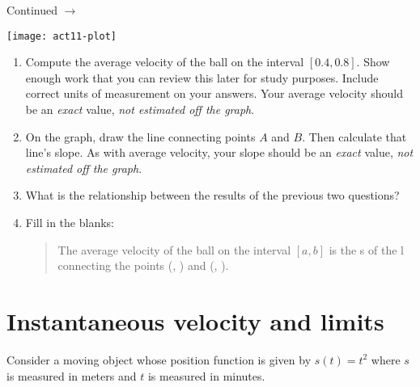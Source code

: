 \documentclass[11pt]{article}
\def\ra{\rightarrow}
\def\pageturn{\vfill 
\begin{flushright}
	\begin{small}
		Continued $\ra$
	\end{small}
\end{flushright} \newpage}
\begin{document}
\pageturn

\begin{center}
	\texttt{[image: act11-plot]}
\end{center}

\begin{enumerate}
	\item Compute the average velocity of the ball on the interval $[0.4, 0.8]$. Show enough work that you can review this later for study purposes. Include correct units of measurement on your answers. Your average velocity should be an \emph{exact} value, \emph{not estimated off the graph}.
	
	\vspace{1in}
	
	\item On the graph, draw the line connecting points $A$ and $B$. Then calculate that line's slope. As with average velocity, your slope should be an \emph{exact} value, \emph{not estimated off the graph}.
	
	\item What is the relationship between the results of the previous two questions? 
	
	\vspace{0.3in}
	
	\item Fill in the blanks: 
	\begin{quote}
		The average velocity of the ball on the interval $[a,b]$ is the s\underline{\hspace{1in}} of the l\underline{\hspace{1in}} connecting the points 
		(\underline{\hspace{0.25in}}, \underline{\hspace{0.25in}}) and (\underline{\hspace{0.25in}}, \underline{\hspace{0.25in}}). 
 	\end{quote} 
\end{enumerate}


\section{Instantaneous velocity and limits}

Consider a moving object whose position function is given by $s(t) = t^2$ where $s$ is measured in meters and $t$ is measured in minutes. 
\end{document}
